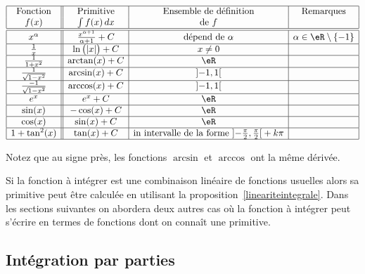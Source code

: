 \label{PageLCHooMbWjOj}
\begin{equation*}
    \begin{array}[]{|c||c|c|c|}
        \hline
        \text{Fonction}&\text{Primitive}&\text{Ensemble de définition}&\text{Remarques}\\
        f(x)&\int f(x)\, dx& \text{de } f&\\
        \hline\hline
        x^{\alpha}&\frac{ x^{\alpha+1} }{ \alpha+1 } + C& \text{dépend de }\alpha&  \alpha\in \eR\setminus\{ -1 \}  \\
        \hline
        \frac{1}{ x }&\ln\big( | x | \big) + C&x\neq 0&\\
        \hline
        \frac{1}{ 1+x^2 }&\arctan(x) + C&\eR&\\
        \hline
        \frac{1}{ \sqrt{1-x^2} }&\arcsin(x) + C&\mathopen] -1 , 1 \mathclose[&\\
        \hline
        \frac{-1}{ \sqrt{1-x^2} }&\arccos(x) + C&\mathopen] -1 , 1 \mathclose[&\\
        \hline
        e^x&e^x + C&\eR&\\
        \hline
        \sin(x)&-\cos(x) + C&\eR&\\
        \hline
        \cos(x)&\sin(x) + C&\eR&\\
        \hline
    1+\tan^2(x)&\tan(x) + C&\text{in intervalle de la forme }\mathopen] -\frac{ \pi }{2} , \frac{ \pi }{2} \mathclose[+k\pi&\\
        \hline
    \end{array}
\end{equation*}



Notez que au signe près, les fonctions \( \arcsin \) et \( \arccos\) ont la même dérivée.

Si la fonction à intégrer est une combinaison linéaire de fonctions usuelles alors sa primitive peut \^etre calculée en utilisant la proposition~\ref{lineariteintegrale}. Dans les sections suivantes on abordera deux autres cas où la fonction à intégrer peut s'écrire en termes de fonctions dont on connaît une primitive.

\subsection{Intégration par parties}

